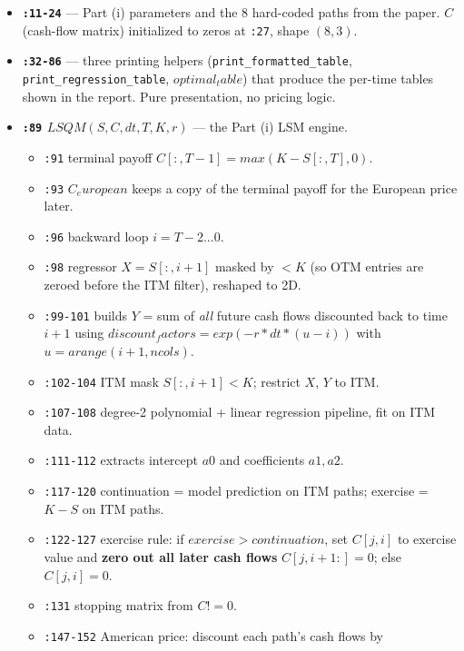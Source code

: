\documentclass[
  11pt,
]{article}
\providecommand{\tightlist}{%
  \setlength{\itemsep}{0pt}\setlength{\parskip}{0pt}}
\begin{document}
\begin{itemize}
\tightlist
\item
  \textbf{\texttt{:11-24}} --- Part (i) parameters and the 8 hard-coded
  paths from the paper. \(C\) (cash-flow matrix) initialized to zeros at
  \texttt{:27}, shape \((8, 3)\).
\item
  \textbf{\texttt{:32-86}} --- three printing helpers
  (\texttt{print\_formatted\_table}, \texttt{print\_regression\_table},
  \(optimal_table\)) that produce the per-time tables shown in the
  report. Pure presentation, no pricing logic.
\item
  \textbf{\texttt{:89} \(LSQM(S,C,dt,T,K,r)\)} --- the Part (i) LSM
  engine.

  \begin{itemize}
  \tightlist
  \item
    \texttt{:91} terminal payoff \(C[:,T-1] = max(K - S[:,T], 0)\).
  \item
    \texttt{:93} \(C_european\) keeps a copy of the terminal payoff for
    the European price later.
  \item
    \texttt{:96} backward loop \(i = T-2 ... 0\).
  \item
    \texttt{:98} regressor \(X = S[:,i+1]\) masked by \(<K\) (so OTM
    entries are zeroed before the ITM filter), reshaped to 2D.
  \item
    \texttt{:99-101} builds \(Y\) = sum of \emph{all} future cash flows
    discounted back to time \(i+1\) using
    \(discount_factors = exp(-r*dt*(u-i))\) with
    \(u = arange(i+1, ncols)\).
  \item
    \texttt{:102-104} ITM mask \(S[:,i+1] < K\); restrict \(X\), \(Y\)
    to ITM.
  \item
    \texttt{:107-108} degree-2 polynomial + linear regression pipeline,
    fit on ITM data.
  \item
    \texttt{:111-112} extracts intercept \(a0\) and coefficients
    \(a1, a2\).
  \item
    \texttt{:117-120} continuation = model prediction on ITM paths;
    exercise = \(K - S\) on ITM paths.
  \item
    \texttt{:122-127} exercise rule: if \(exercise > continuation\), set
    \(C[j,i]\) to exercise value and \textbf{zero out all later cash
    flows} \(C[j,i+1:] = 0\); else \(C[j,i] = 0\).
  \item
    \texttt{:131} stopping matrix from \(C != 0\).
  \item
    \texttt{:147-152} American price: discount each path's cash flows by

\end{itemize}
\end{itemize}
\end{document}
